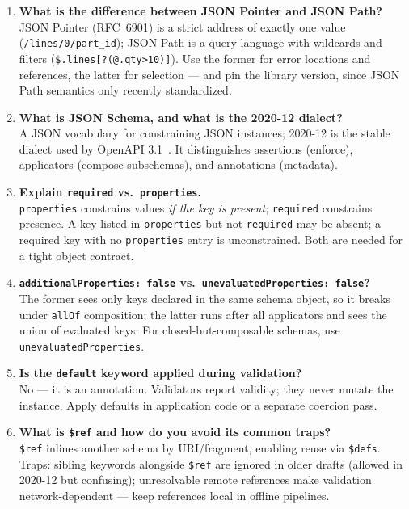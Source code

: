 \begin{enumerate}[label=\textbf{Q\arabic*.}, leftmargin=1.3cm, itemsep=0.8em]
\item \textbf{What is the difference between JSON Pointer and JSON Path?}\\
JSON Pointer (RFC~6901) is a strict address of exactly one value
(\texttt{/lines/0/part\_id}); JSON Path is a query language with wildcards and
filters (\texttt{\$.lines[?(@.qty>10)]}). Use the former for error locations and
references, the latter for selection --- and pin the library version, since JSON
Path semantics only recently standardized.

\item \textbf{What is JSON Schema, and what is the 2020-12 dialect?}\\
A JSON vocabulary for constraining JSON instances; 2020-12 is the stable dialect
used by OpenAPI 3.1~\cite{jsonschemadocs}. It distinguishes assertions (enforce),
applicators (compose subschemas), and annotations (metadata).

\item \textbf{Explain \texttt{required} vs.\ \texttt{properties}.}\\
\texttt{properties} constrains values \emph{if the key is present};
\texttt{required} constrains presence. A key listed in \texttt{properties} but not
\texttt{required} may be absent; a required key with no \texttt{properties} entry
is unconstrained. Both are needed for a tight object contract.

\item \textbf{\texttt{additionalProperties: false} vs.\
\texttt{unevaluatedProperties: false}?}\\
The former sees only keys declared in the same schema object, so it breaks under
\texttt{allOf} composition; the latter runs after all applicators and sees the
union of evaluated keys. For closed-but-composable schemas, use
\texttt{unevaluatedProperties}.

\item \textbf{Is the \texttt{default} keyword applied during validation?}\\
No --- it is an annotation. Validators report validity; they never mutate the
instance. Apply defaults in application code or a separate coercion pass.

\item \textbf{What is \texttt{\$ref} and how do you avoid its common traps?}\\
\texttt{\$ref} inlines another schema by URI/fragment, enabling reuse via
\texttt{\$defs}. Traps: sibling keywords alongside \texttt{\$ref} are ignored in
older drafts (allowed in 2020-12 but confusing); unresolvable remote references
make validation network-dependent --- keep references local in offline pipelines.


\end{enumerate}
